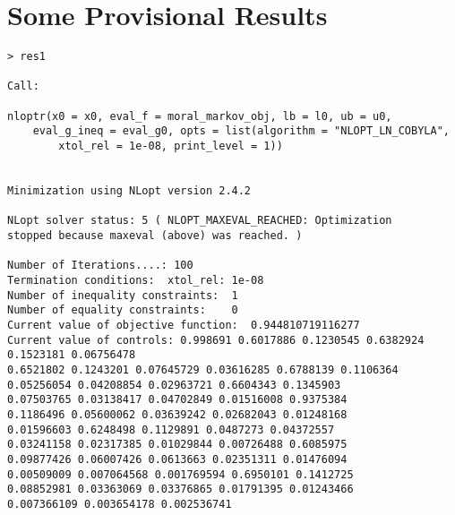 \documentclass{amsart}
\begin{document}
\section{Some Provisional Results}

\begin{verbatim}
> res1

Call:

nloptr(x0 = x0, eval_f = moral_markov_obj, lb = l0, ub = u0, 
    eval_g_ineq = eval_g0, opts = list(algorithm = "NLOPT_LN_COBYLA", 
        xtol_rel = 1e-08, print_level = 1))


Minimization using NLopt version 2.4.2 

NLopt solver status: 5 ( NLOPT_MAXEVAL_REACHED: Optimization 
stopped because maxeval (above) was reached. )

Number of Iterations....: 100 
Termination conditions:  xtol_rel: 1e-08 
Number of inequality constraints:  1 
Number of equality constraints:    0 
Current value of objective function:  0.944810719116277 
Current value of controls: 0.998691 0.6017886 0.1230545 0.6382924 0.1523181 0.06756478 
0.6521802 0.1243201 0.07645729 0.03616285 0.6788139 0.1106364 
0.05256054 0.04208854 0.02963721 0.6604343 0.1345903 
0.07503765 0.03138417 0.04702849 0.01516008 0.9375384 
0.1186496 0.05600062 0.03639242 0.02682043 0.01248168 
0.01596603 0.6248498 0.1129891 0.0487273 0.04372557 
0.03241158 0.02317385 0.01029844 0.00726488 0.6085975 
0.09877426 0.06007426 0.0613663 0.02351311 0.01476094 
0.00509009 0.007064568 0.001769594 0.6950101 0.1412725 
0.08852981 0.03363069 0.03376865 0.01791395 0.01243466 
0.007366109 0.003654178 0.002536741
\end{verbatim}
\end{document}
